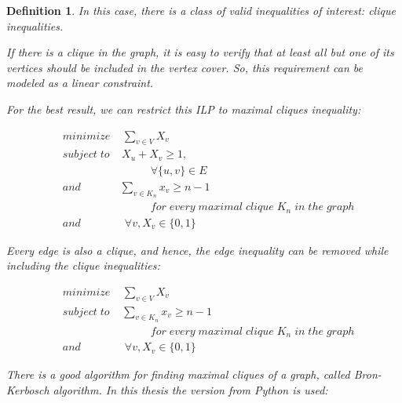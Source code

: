 \documentclass[12pt]{article}
\theoremstyle{slplain}
\newtheorem{defi}{Definition}
\begin{document}
\begin{defi}
In this case, there is a class of valid inequalities of interest: clique inequalities.

If there is a clique in the graph, it is easy to verify that at least all but one
of its vertices should be included in the vertex cover. So, this requirement can be modeled as a linear constraint.

For the best result, we can restrict this ILP to maximal cliques inequality:


\begin{align*}
&minimize \; \;\; \; \sum_{v\in V}X_v\\
&subject\; to \;\;\; \; X_u + X_v  \geq 1 ,\\
&\qquad 	\qquad\qquad\qquad	 \forall \{u,v\} \in E\\
&and	\qquad\quad\;\; \sum_{v\in K_n}x_v \geq n - 1\\
& \qquad\qquad \qquad\qquad for\; every\; maximal\; clique\; K_n\; in\; the\; graph\\
&and	\qquad\qquad	 \forall v, X_v\in \{0,1\}
\end{align*}

Every edge is also a clique, and hence, the edge inequality can be removed
while including the clique inequalities:

\begin{align*}
&minimize \; \;\; \; \sum_{v\in V}X_v\\
&subject\; to \;\;\; \; \sum_{v\in K_n}x_v \geq n - 1\\
& \qquad\qquad \qquad\qquad for\; every\; maximal\; clique\; K_n\; in\; the\; graph\\
&and	\qquad\qquad	 \forall v, X_v\in \{0,1\}
\end{align*}

There is a good algorithm for finding maximal cliques of a graph, called Bron-Kerbosch\cite{bron} algorithm. In this thesis the version from Python is used:

\newpage

\begin{algorithm}
\begin{algorithmic}

\end{algorithmic}
\end{algorithm}
\end{defi}
\end{document}
